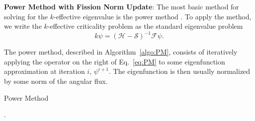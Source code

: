 \textbf{Power Method with Fission Norm Update}: The most basic method for solving for the $k$-effective eigenvalue is the power method \cite{lewis_computational_1984}. To apply the method, we write the $k$-effective criticality problem as the standard eigenvalue problem
\begin{equation}
k \psi = (\mathcal{H} - \mathcal{S})^{-1} \mathcal{F}\psi.
\label{eq:PM}
\end{equation}

The power method, described in Algorithm~\ref{algo:PM}, consists of iteratively applying the operator on the right of Eq.~\ref{eq:PM} to some eigenfunction approximation at iteration $i$, $\psi^{i+1}$. The eigenfunction is then usually normalized by some norm of the angular flux.%

\begin{algorithm}[H]
				\caption{Power Method \cite{lewis_computational_1984}}
				\begin{algorithmic}[1]
						.
					\ENDFOR
				\end{algorithmic}
				\label{algo:PM}
\end{algorithm}

